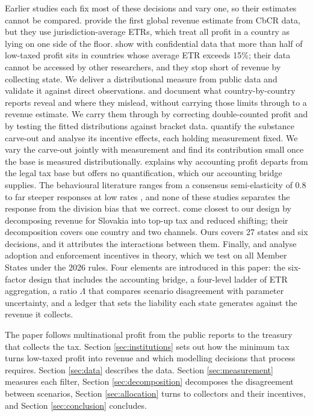 \documentclass[11pt,a4paper]{article}
\begin{document}
Earlier studies each fix most of these decisions and vary one, so their estimates cannot be compared. \citet{barake2022} provide the first global revenue estimate from CbCR data, but they use jurisdiction-average ETRs, which treat all profit in a country as lying on one side of the floor. \citet{hugger2026} show with confidential data that more than half of low-taxed profit sits in countries whose average ETR exceeds 15\%; their data cannot be accessed by other researchers, and they stop short of revenue by collecting state. We deliver a distributional measure from public data and validate it against direct observations. \citet{godar2024} and \citet{tuinsma2025} document what country-by-country reports reveal and where they mislead, without carrying those limits through to a revenue estimate. We carry them through by correcting double-counted profit and by testing the fitted distributions against bracket data. \citet{devereux2023} quantify the substance carve-out and \citet{schjelderup2024} analyse its incentive effects, each holding measurement fixed. We vary the carve-out jointly with measurement and find its contribution small once the base is measured distributionally. \citet{hanlon2023} explains why accounting profit departs from the legal tax base but offers no quantification, which our accounting bridge supplies. The behavioural literature ranges from a consensus semi-elasticity of 0.8 \citep{heckemeyer2017} to far steeper responses at low rates \citep{dowd2017,garcia-bernardo2024}, and none of these studies separates the response from the division bias that we correct. \citet{boukal2026} come closest to our design by decomposing revenue for Slovakia into top-up tax and reduced shifting; their decomposition covers one country and two channels. Ours covers 27 states and six decisions, and it attributes the interactions between them. Finally, \citet{devereux2022} and \citet{jean2026} analyse adoption and enforcement incentives in theory, which we test on all Member States under the 2026 rules. Four elements are introduced in this paper: the six-factor design that includes the accounting bridge, a four-level ladder of ETR aggregation, a ratio $\Lambda$ that compares scenario disagreement with parameter uncertainty, and a ledger that sets the liability each state generates against the revenue it collects.

The paper follows multinational profit from the public reports to the treasury that collects the tax. Section \ref{sec:institutions} sets out how the minimum tax turns low-taxed profit into revenue and which modelling decisions that process requires. Section \ref{sec:data} describes the data. Section \ref{sec:measurement} measures each filter, Section \ref{sec:decomposition} decomposes the disagreement between scenarios, Section \ref{sec:allocation} turns to collectors and their incentives, and Section \ref{sec:conclusion} concludes.
\end{document}
